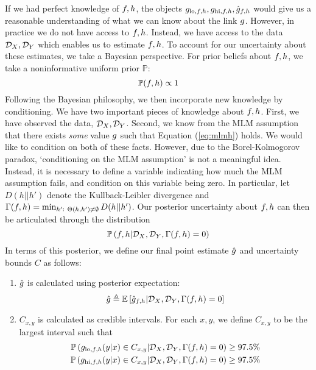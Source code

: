 If we had perfect knowledge of $f,h$, the objects $g_{\mathrm{lo},f,h}, g_{\mathrm{hi},f,h},\hat {g}_{f,h}$ would give us a reasonable understanding of what we can know about the link $g$.  However, in practice we do not have access to $f,h$.  Instead, we have access to the data ${\mathcal{D}_X},{\mathcal{D}_Y}$ which enables us to estimate $f,h$.  To account for our uncertainty about these estimates, we take a Bayesian perspective.  For prior beliefs about $f,h$, we take a noninformative uniform prior $\mathbb{P}$:
\[
\mathbb{P}(f,h) \propto 1
\]
Following the Bayesian philosophy, we then incorporate new knowledge by conditioning.  We have two important pieces of knowledge about $f,h$.  First, we have observed the data, ${\mathcal{D}_X},{\mathcal{D}_Y}$.  Second, we know from the MLM assumption that there exists \emph{some} value $g$ such that Equation (\ref{eq:mlmh}) holds.  We would like to condition on both of these facts.  However, due to the Borel-Kolmogorov paradox, `conditioning on the MLM assumption' is not a meaningful idea.  Instead, it is necessary to define a variable indicating how much the MLM assumption fails, and condition on this variable being zero.  In particular, let $D(h||h')$ denote the Kullback-Leibler divergence and $\Gamma(f,h) = \min_{h':\ \Theta(h,h')\neq \emptyset} D(h||h')$.  Our posterior uncertainty about $f,h$ can then be articulated through the distribution
\[
\mathbb{P}\left(f,h | {\mathcal{D}_X},{\mathcal{D}_Y},\Gamma(f,h)=0\right)
\]
In terms of this posterior, we define our final point estimate $\hat {g}$ and uncertainty bounds $C$ as follows:
\begin{enumerate}
    \item $\hat {g}$ is calculated using posterior expectation:
    \[
    \hat {g} \triangleq \mathbb{E}\left[\hat {g}_{f,h} | {\mathcal{D}_X},{\mathcal{D}_Y},\Gamma(f,h)=0\right]
    \]
    \item $C_{x,y}$ is calculated as credible intervals.  For each $x,y$, we define $C_{x,y}$ to be the largest interval such that 
    \begin{align*}
    \mathbb{P}\left(g_{\mathrm{lo},f,h}(y|x) \in C_{x,y} | {\mathcal{D}_X},{\mathcal{D}_Y},\Gamma(f,h)=0\right)\geq 97.5\% \\
    \mathbb{P}\left(g_{\mathrm{hi},f,h}(y|x) \in C_{x,y} | {\mathcal{D}_X},{\mathcal{D}_Y},\Gamma(f,h)=0\right)\geq 97.5\% 
    \end{align*}
\end{enumerate}

